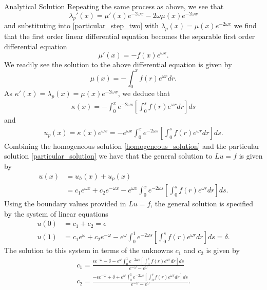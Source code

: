 \documentclass{article}
\begin{document}
\begin{section}{Analytical Solution}
  Repeating the same process as above, we see that
  \[
    \lambda_p'(x) = \mu'(x) e^{-2 \omega x} - 2 \omega\mu(x) e^{-2 \omega x}
  \]
  and substituting into \eqref{particular_step_two} with $\lambda_p(x) = \mu(x) e^{-2\omega x}$
  we find that the first order linear differential equation becomes the separable first order differential
  equation
  \[
    \mu'(x) = -f(x)e^{\omega x}.
  \]
  We readily see the solution to the above differential equation is given by
  \[
    \mu(x) = - \int_{0}^x f(r) e^{\omega r} dr.
  \]
  As $\kappa'(x) = \lambda_p(x) = \mu(x)e^{-2\omega x}$, we deduce that
  \begin{align*}
    \kappa(x) = - \int_{0}^{x} e^{-2 \omega s} \left[ \int_{0}^s f(r) e^{\omega r} dr \right] ds
  \end{align*}
  and
  \begin{align}\label{particular_solution}
    u_p(x) = \kappa(x)e^{\omega x} = -e^{\omega x} \int_{0}^{x} e^{-2 \omega s} \left[ \int_{0}^s f(r) e^{\omega r} dr \right] ds.
  \end{align}
  Combining the homogeneous solution \eqref{homogeneous_solution} and the particular
  solution \eqref{particular_solution} we have that the general solution to
  $Lu = f$ is given by
  \begin{align}\label{general_analytical_solution}
    u(x) &= u_h(x) + u_p(x) \nonumber \\
    &= c_1 e^{\omega x} + c_2 e^{-\omega x} - e^{\omega x} \int_{0}^{x} e^{-2 \omega s} \left[ \int_{0}^s f(r) e^{\omega r} dr \right] ds.
  \end{align}
  Using the boundary values provided in $Lu=f$, the general solution is specified
  by the system of linear equations
  \begin{align*}
    u(0) &= c_1 + c_2 = \epsilon \\
    u(1) &= c_1 e^{\omega} + c_2 e^{-\omega} - e^{\omega} \int_{0}^{1} e^{-2 \omega s} \left[ \int_{0}^s f(r) e^{\omega r} dr \right] ds = \delta .
  \end{align*}
  The solution to this system in terms of the unknowns $c_1$ and $c_2$ is given
  by
  \begin{align*}
    c_1 = \frac{\epsilon e^{-\omega} - \delta - e^{\omega} \int_{0}^{1} e^{-2 \omega s} \left[ \int_{0}^s f(r) e^{\omega r} dr \right] ds}{e^{-\omega} - e^{\omega}}\\
    c_2 = \frac{-\epsilon e^{-\omega} + \delta + e^{\omega} \int_{0}^{1} e^{-2 \omega s} \left[ \int_{0}^s f(r) e^{\omega r} dr \right] ds}{e^{-\omega} - e^{\omega}}.
  \end{align*}


\end{section}
\end{document}
